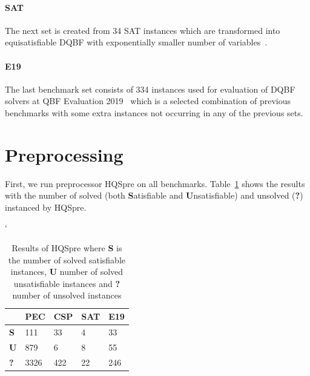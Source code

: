 \documentclass[
  digital, %
  color,
  twoside, %
  table,   %
  nolof,     %
  nolot,     %
]{fithesis3}
\theoremstyle{definition}
\theoremstyle{remark}
\begin{document}
\paragraph{SAT}
The next set is created from 34 SAT instances which are transformed into equisatisfiable DQBF with exponentially smaller number of variables~\cite{SATbenchmarks}.

\paragraph{E19}
The last benchmark set consists of 334 instances used for evaluation of DQBF solvers at QBF Evaluation 2019~\cite{QBFeval19} which is a selected combination of previous benchmarks with some extra instances not occurring in any of the previous sets.





\section{Preprocessing}
First, we run preprocessor HQSpre on all benchmarks. Table~\ref{tab:HQSpre} shows the results with the number of solved (both \textbf{S}atisfiable and \textbf{U}n\-sa\-ti\-sfi\-able) and unsolved (\textbf{?}) instanced by HQSpre.

\begin{table}[ht]
\centering
\catcode`
\begin{tabular}{c|l|l|l|l|}
\cline{2-5}
\cellcolor{white}                 & \textbf{PEC} & \textbf{CSP} & \textbf{SAT} & \textbf{E19} \\ \hline
\multicolumn{1}{|l|}{\textbf{S}}  & 111          & 33           & 4            & 33           \\ \hline
\multicolumn{1}{|l|}{\textbf{U}}  & 879          & 6            & 8            & 55           \\ \hline
\multicolumn{1}{|l|}{\textbf{?}} & 3326         & 422          & 22           & 246          \\ \hline
\end{tabular}
\caption{Results of HQSpre where \textbf{S} is the number of solved satisfiable instances, \textbf{U} number of solved unsatisfiable instances and \textbf{?} number of unsolved instances}
\label{tab:HQSpre}
\end{table}
\end{document}
